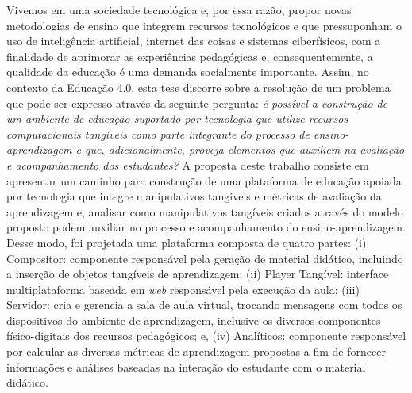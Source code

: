 % 
\begin{resumo}

Vivemos em uma sociedade tecnológica e, por essa razão, propor novas metodologias de ensino que integrem recursos tecnológicos e que pressuponham o uso de inteligência artificial, internet das coisas e sistemas ciberfísicos, com a finalidade de aprimorar as experiências pedagógicas e, consequentemente, a qualidade da educação é uma demanda socialmente importante. Assim, no contexto da Educação 4.0, esta tese discorre sobre a resolução de um problema que pode ser expresso através da seguinte pergunta: \textit{é possível a construção de um ambiente de educação suportado por tecnologia que utilize recursos computacionais tangíveis como parte integrante do processo de ensino-aprendizagem e que, adicionalmente, proveja elementos que auxiliem na avaliação e acompanhamento dos estudantes?}
A proposta deste trabalho consiste em apresentar um caminho para construção de uma plataforma de educação apoiada por tecnologia que integre manipulativos tangíveis e métricas de avaliação da aprendizagem e, analisar como manipulativos tangíveis criados através do modelo proposto podem auxiliar no processo e acompanhamento do ensino-aprendizagem.
Desse modo, foi projetada uma plataforma composta de quatro partes: (i) Compositor: componente responsável pela geração de material didático, incluindo a inserção de objetos tangíveis de aprendizagem; (ii) Player Tangível: interface multiplataforma baseada em \textit{web} responsável pela execução da aula;%
(iii) Servidor: cria e gerencia a sala de aula virtual, trocando mensagens com todos os dispositivos do ambiente de aprendizagem, inclusive os diversos componentes físico-digitais dos recursos pedagógicos; e, (iv) Analíticos: componente responsável por calcular as diversas métricas de aprendizagem propostas a fim de fornecer informações e análises baseadas na interação do estudante com o material didático.

\end{resumo}
